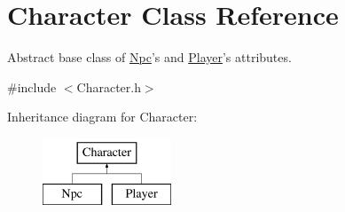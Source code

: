 \hypertarget{classCharacter}{\section{Character Class Reference}
\label{classCharacter}
}


Abstract base class of \hyperlink{classNpc}{Npc}'s and \hyperlink{classPlayer}{Player}'s attributes.  




{\ttfamily \#include $<$Character.\-h$>$}

Inheritance diagram for Character\-:\begin{figure}[H]
\begin{center}
\leavevmode
\includegraphics[height=2.000000cm]{classCharacter}
\end{center}
\end{figure}
